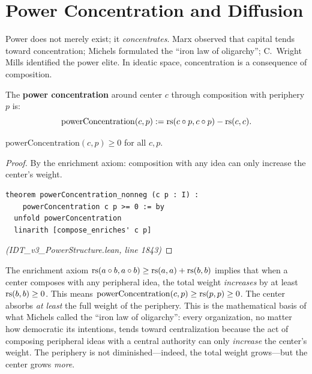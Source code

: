 \section{Power Concentration and Diffusion}

Power does not merely exist; it \emph{concentrates}. Marx observed that capital
tends toward concentration; Michels formulated the ``iron law of oligarchy'';
C.~Wright Mills identified the power elite. In ideatic space, concentration is
a consequence of composition.

\begin{definition}
\label{def:power-concentration}
The \textbf{power concentration} around center $c$ through composition with
periphery $p$ is:
\[
  \mathrm{powerConcentration}(c, p) := \mathrm{rs}(c \circ p, c \circ p) - \mathrm{rs}(c, c).
\]
\end{definition}

\begin{theorem}
\label{thm:concentration-nonneg}
$\mathrm{powerConcentration}(c, p) \geq 0$ for all $c, p$.
\end{theorem}

\begin{proof}
By the enrichment axiom: composition with any idea can only increase the
center's weight.
\begin{lstlisting}
theorem powerConcentration_nonneg (c p : I) :
    powerConcentration c p >= 0 := by
  unfold powerConcentration
  linarith [compose_enriches' c p]
\end{lstlisting}
\textit{(IDT\_v3\_PowerStructure.lean, line 1843)}
\end{proof}

\begin{remark}
The enrichment axiom $\mathrm{rs}(a \circ b, a \circ b) \geq \mathrm{rs}(a,a) + \mathrm{rs}(b,b)$
implies that when a center composes with any peripheral idea, the total weight
\emph{increases} by at least $\mathrm{rs}(b,b) \geq 0$. This means
$\mathrm{powerConcentration}(c,p) \geq \mathrm{rs}(p,p) \geq 0$. The center absorbs
\emph{at least} the full weight of the periphery. This is the mathematical
basis of what Michels called the ``iron law of oligarchy'': every organization,
no matter how democratic its intentions, tends toward centralization because
the act of composing peripheral ideas with a central authority can only
\emph{increase} the center's weight. The periphery is not diminished---indeed,
the total weight grows---but the center grows \emph{more}.
\end{remark}

